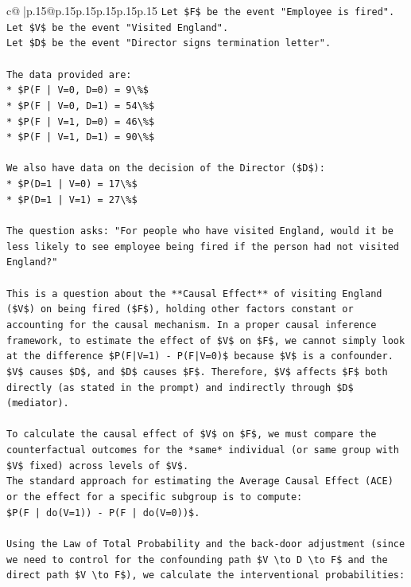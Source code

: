 \documentclass{article}
\begin{document}
{\begin{supertabular}{c@{$\;$}|p{.15\linewidth}@{}p{.15\linewidth}p{.15\linewidth}p{.15\linewidth}p{.15\linewidth}p{.15\linewidth}}
{{{\texttt{Let \$F\$ be the event "Employee is fired".} \\
\texttt{Let \$V\$ be the event "Visited England".} \\
\texttt{Let \$D\$ be the event "Director signs termination letter".} \\
\\ 
\texttt{The data provided are:} \\
\texttt{*   \$P(F | V=0, D=0) = 9\textbackslash{}\%\$} \\
\texttt{*   \$P(F | V=0, D=1) = 54\textbackslash{}\%\$} \\
\texttt{*   \$P(F | V=1, D=0) = 46\textbackslash{}\%\$} \\
\texttt{*   \$P(F | V=1, D=1) = 90\textbackslash{}\%\$} \\
\\ 
\texttt{We also have data on the decision of the Director (\$D\$):} \\
\texttt{*   \$P(D=1 | V=0) = 17\textbackslash{}\%\$} \\
\texttt{*   \$P(D=1 | V=1) = 27\textbackslash{}\%\$} \\
\\ 
\texttt{The question asks: "For people who have visited England, would it be less likely to see employee being fired if the person had not visited England?"} \\
\\ 
\texttt{This is a question about the **Causal Effect** of visiting England (\$V\$) on being fired (\$F\$), holding other factors constant or accounting for the causal mechanism. In a proper causal inference framework, to estimate the effect of \$V\$ on \$F\$, we cannot simply look at the difference \$P(F|V=1) {-} P(F|V=0)\$ because \$V\$ is a confounder. \$V\$ causes \$D\$, and \$D\$ causes \$F\$. Therefore, \$V\$ affects \$F\$ both directly (as stated in the prompt) and indirectly through \$D\$ (mediator).} \\
\\ 
\texttt{To calculate the causal effect of \$V\$ on \$F\$, we must compare the counterfactual outcomes for the *same* individual (or same group with \$V\$ fixed) across levels of \$V\$.} \\
\texttt{The standard approach for estimating the Average Causal Effect (ACE) or the effect for a specific subgroup is to compute:} \\
\texttt{\$P(F | do(V=1)) {-} P(F | do(V=0))\$.} \\
\\ 
\texttt{Using the Law of Total Probability and the back{-}door adjustment (since we need to control for the confounding path \$V \textbackslash{}to D \textbackslash{}to F\$ and the direct path \$V \textbackslash{}to F\$), we calculate the interventional probabilities:} \\
}}}
\end{supertabular}}
\end{document}
